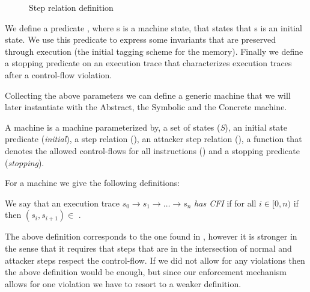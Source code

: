 \begin{figure}[htb!]
\centering
\begin{minipage}[b]{0.25\linewidth}
\centering
{}
\label{fig:step_stepn}
\end{minipage}
\hspace{0.5cm}
\begin{minipage}[b]{0.15\linewidth}
\centering
{}
\label{fig:step_stepa}
\end{minipage}
\caption{Step relation definition}
\end{figure}

We define a predicate , where s is a machine state, that
states that s is an initial state. We use this predicate to express some
invariants that are preserved through execution (\EG the initial tagging scheme
for the memory). Finally we define a stopping predicate on an execution trace
that characterizes execution traces after a control-flow violation.

Collecting the above parameters we can define a generic \CFI machine
that we will later instantiate with the Abstract, the Symbolic and the
Concrete machine.

\begin{definition}
\label{cfi_machine}
A \CFI machine is a machine parameterized by, a set of states
(\textit{S}), an initial state predicate (\textit{initial}), a step
relation (\stepn{}{}), an attacker step relation (\stepa{}{}{}), a
function that denotes the allowed control-flows for all instructions
(\SUCC{}) and a stopping predicate (\textit{stopping}).
\end{definition}

For a \CFI machine we give the following definitions:

\begin{definition}\label{traceHasCfi}
  We say that an execution trace $s_0 \to s_1 \to \ldots \to s_n$ {\em has CFI}
  if for all $ i \in [0,n)$ if  then
  $(s_i,s_{i+1}) \in$ \SUCC{}.
\end{definition}

The above definition corresponds to the one found in \cite{AbadiBEL09}, however
it is stronger in the sense that it requires that steps that are in the
intersection of normal and attacker steps respect the control-flow. If we did
not allow for any violations then the above definition would be enough, but
since our enforcement mechanism allows for one violation we have to resort to a
weaker definition.

